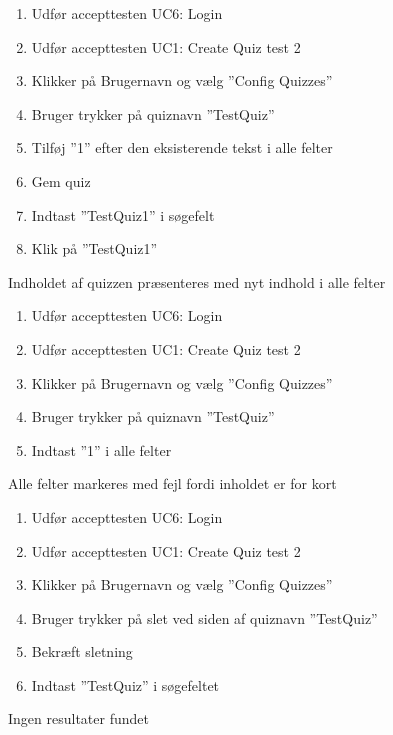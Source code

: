 
		{
		\begin{enumerate}
			\item Udfør accepttesten UC6: Login
			\item Udfør accepttesten UC1: Create Quiz test 2
			\item Klikker på Brugernavn og vælg ''Config Quizzes''
			\item Bruger trykker på quiznavn ''TestQuiz''
			\item Tilføj ''1'' efter den eksisterende tekst i alle felter
			\item Gem quiz
			\item Indtast ''TestQuiz1'' i søgefelt
			\item Klik på ''TestQuiz1''
		\end{enumerate}
		} %
		{Indholdet af quizzen præsenteres med nyt indhold i alle felter} %
		{} %
		{} %

		{
		\begin{enumerate}
			\item Udfør accepttesten UC6: Login
			\item Udfør accepttesten UC1: Create Quiz test 2
			\item Klikker på Brugernavn og vælg ''Config Quizzes''
			\item Bruger trykker på quiznavn ''TestQuiz''
			\item Indtast ''1'' i alle felter
		\end{enumerate}
		} %
		{Alle felter markeres med fejl fordi inholdet er for kort} %
		{} %
		{} %

		{
		\begin{enumerate}
			\item Udfør accepttesten UC6: Login
			\item Udfør accepttesten UC1: Create Quiz test 2
			\item Klikker på Brugernavn og vælg ''Config Quizzes''
			\item Bruger trykker på slet ved siden af quiznavn ''TestQuiz''
			\item Bekræft sletning
			\item Indtast ''TestQuiz'' i søgefeltet
		\end{enumerate}
		} %
		{Ingen resultater fundet} %
		{} %
		{} %

